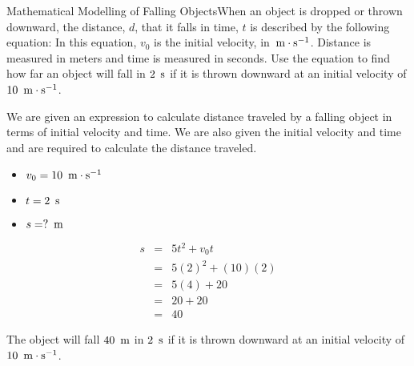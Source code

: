 \begin{wex}{Mathematical Modelling of Falling Objects}{When an object is dropped or thrown downward, the distance, $d$, that it falls in time, $t$ is described by the following equation:
In this equation, $v_0$ is the initial velocity, in $\,\mathrm{m \cdot s^{-1}}$. Distance is measured in meters and time is measured in seconds. Use the equation to find how far an object will fall in $2~\,\mathrm{s}$ if it is thrown downward at an initial velocity of $10~\,\mathrm{m \cdot s^{-1}}$.}
{
We are given an expression to calculate distance traveled by a falling object in terms of initial velocity and time. We are also given the initial velocity and time and are required to calculate the distance traveled.

\begin{itemize}
\item $v_0 = 10~\,\mathrm{m \cdot s^{-1}}$
\item $t = 2~\,\mathrm{s}$
\item $s = ?~\,\rm{m}$
\end{itemize}

\begin{eqnarray*}
s &=& 5t^2 + v_0t\\
&=&5(2)^2+(10)(2)\\
&=&5(4)+20\\
&=&20+20\\
&=&40
\end{eqnarray*}

The object will fall $40~\,\rm{m}$ in $2~\,\mathrm{s}$ if it is thrown downward at an initial velocity of $10~\,\mathrm{m \cdot s^{-1}}$.}
\end{wex}


